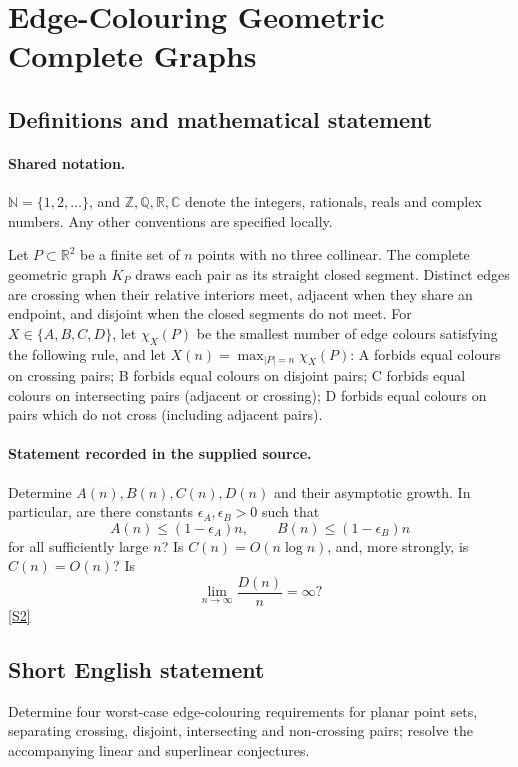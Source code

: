 \documentclass[11pt]{book}
\newcommand{\sref}[2]{\hyperlink{source:#1:#2}{[S#2]}}
\begin{document}
\section{Edge-Colouring Geometric Complete Graphs}\label{statement}

\subsection{Definitions and mathematical statement}

\paragraph{Shared notation.}$\mathbb N=\{1,2,\ldots\}$, and $\mathbb Z,\mathbb Q,\mathbb R,\mathbb C$ denote the integers, rationals, reals and complex numbers. Any other conventions are specified locally.


Let $P\subset\mathbb R^2$ be a finite set of $n$ points with no three collinear. The complete geometric graph $K_P$ draws each pair as its straight closed segment. Distinct edges are crossing when their relative interiors meet, adjacent when they share an endpoint, and disjoint when the closed segments do not meet. For $X\in\{A,B,C,D\}$, let $\chi_X(P)$ be the smallest number of edge colours satisfying the following rule, and let $X(n)=\max_{|P|=n}\chi_X(P)$: A forbids equal colours on crossing pairs; B forbids equal colours on disjoint pairs; C forbids equal colours on intersecting pairs (adjacent or crossing); D forbids equal colours on pairs which do not cross (including adjacent pairs).
\paragraph{Statement recorded in the supplied source.}
Determine $A(n),B(n),C(n),D(n)$ and their asymptotic growth. In particular, are there constants $\epsilon_A,\epsilon_B>0$ such that
\[A(n)\leq(1-\epsilon_A)n,\qquad B(n)\leq(1-\epsilon_B)n\]
for all sufficiently large $n$? Is $C(n)=O(n\log n)$, and, more strongly, is $C(n)=O(n)$? Is
\[\lim_{n\to\infty}\frac{D(n)}n=\infty?\] \sref{statement}{2}
\subsection{Short English statement}
Determine four worst-case edge-colouring requirements for planar point sets, separating crossing, disjoint, intersecting and non-crossing pairs; resolve the accompanying linear and superlinear conjectures.
\end{document}
